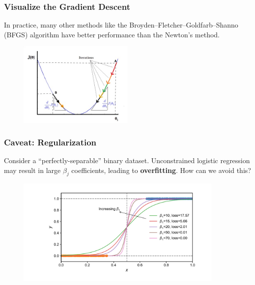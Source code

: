 \documentclass[10pt,aspectratio=169]{beamer}
\begin{document}
      \begin{frame}
        \frametitle{Visualize the Gradient Descent}

        In practice, many other methods like the
        Broyden–Fletcher–Goldfarb–Shanno (BFGS) algorithm have better
        performance than the Newton's method.

        \begin{figure}[t]
          \includegraphics[width=0.5\textwidth]{images/gd-placeholder.jpg}
        \end{figure}
      \end{frame}

      \begin{frame}
        \frametitle{Caveat: Regularization}
        Consider a ``perfectly-separable'' binary
        dataset. Unconstrained logistic regression may result in large
        $\beta_{j}$ coefficients, leading to \textbf{overfitting}. How
        can we avoid this?

        \begin{figure}[t]
          \includegraphics[width=0.90\textwidth]{scripts/perfect_sep.pdf}
        \end{figure}
        
      \end{frame}
\end{document}
